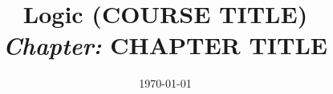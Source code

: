 \title{%
  Logic (COURSE TITLE)\\
  \emph{Chapter:} \textbf{CHAPTER TITLE}%
}

\date{\today} %

\newcommand{\FirstLecturer}  {PERSON 1}           %
\newcommand{\SecondLecturer} {PERSON 2}           %

\newcommand{\GroupFirstLecturer}  {GROUP 1}
\newcommand{\GroupSecondLecturer} {GROUP 2}
